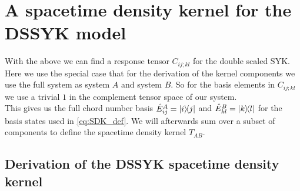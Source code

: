 \documentclass[11pt,a4paper]{article}
\begin{document}
%
%

\section{A spacetime density kernel for the DSSYK model}

With the above we can find a response tensor $C_{ij;kl}$ for the double scaled SYK. Here we use the special case that for the derivation of the kernel components we use the full system as system $A$ and system $B$. So for the basis elements in $C_{ij;kl}$ we use a trivial $1$ in the complement tensor space of our system.\\
This gives us the full chord number basis $\hat{E}_{ij}^{A} = \ketbra{i}{j}$ and $\hat{E}_{kl}^{B} = \ketbra{k}{l}$ 
for the basis states used in \cref{eq:SDK_def}. We will afterwards sum over a subset of components to define the spacetime density kernel $T_{AB}$.

\subsection{Derivation of the DSSYK spacetime density kernel}
\end{document}
